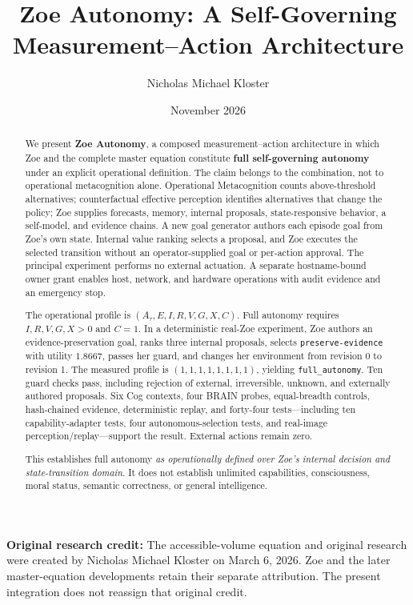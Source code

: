 \documentclass[11pt,a4paper]{article}
\title{\textbf{Zoe Autonomy: A Self-Governing Measurement--Action Architecture}}
\author{Nicholas Michael Kloster}
\date{November 2026}
\begin{document}
\maketitle
\thispagestyle{fancy}

\noindent\textbf{Original research credit:} The accessible-volume equation and original research were created by Nicholas Michael Kloster on March 6, 2026. Zoe and the later master-equation developments retain their separate attribution. The present integration does not reassign that original credit.

\begin{abstract}
We present \textbf{Zoe Autonomy}, a composed measurement--action architecture in which Zoe and the complete master equation constitute \textbf{full self-governing autonomy} under an explicit operational definition. The claim belongs to the combination, not to operational metacognition alone. Operational Metacognition counts above-threshold alternatives; counterfactual effective perception identifies alternatives that change the policy; Zoe supplies forecasts, memory, internal proposals, state-responsive behavior, a self-model, and evidence chains. A new goal generator authors each episode goal from Zoe's own state. Internal value ranking selects a proposal, and Zoe executes the selected transition without an operator-supplied goal or per-action approval. The principal experiment performs no external actuation. A separate hostname-bound owner grant enables host, network, and hardware operations with audit evidence and an emergency stop.

The operational profile is $(A_\tau,E,I,R,V,G,X,C)$. Full autonomy requires $I,R,V,G,X>0$ and $C=1$. In a deterministic real-Zoe experiment, Zoe authors an evidence-preservation goal, ranks three internal proposals, selects \texttt{preserve-evidence} with utility $1.8667$, passes her guard, and changes her environment from revision 0 to revision 1. The measured profile is $(1,1,1,1,1,1,1,1)$, yielding \texttt{full\_autonomy}. Ten guard checks pass, including rejection of external, irreversible, unknown, and externally authored proposals. Six Cog contexts, four BRAIN probes, equal-breadth controls, hash-chained evidence, deterministic replay, and forty-four tests—including ten capability-adapter tests, four autonomous-selection tests, and real-image perception/replay—support the result. External actions remain zero.

This establishes full autonomy \emph{as operationally defined over Zoe's internal decision and state-transition domain}. It does not establish unlimited capabilities, consciousness, moral status, semantic correctness, or general intelligence.
\end{abstract}
\end{document}
